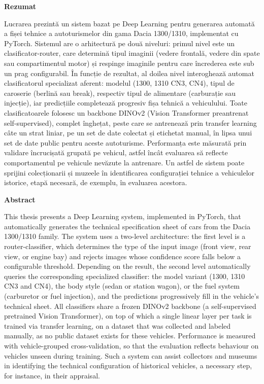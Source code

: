 \begin{abstractpage}
	\begin{center}
		{\bf Rezumat}
	\end{center}
	\indent Lucrarea prezintă un sistem bazat pe Deep Learning pentru generarea automată a fișei tehnice a autoturismelor din gama Dacia 1300/1310, implementat cu PyTorch. Sistemul are o arhitectură pe două niveluri: primul nivel este un clasificator-router, care determină tipul imaginii (vedere frontală, vedere din spate sau compartimentul motor) și respinge imaginile pentru care încrederea este sub un prag configurabil. În funcție de rezultat, al doilea nivel interoghează automat clasificatorul specializat aferent: modelul (1300, 1310 CN3, CN4), tipul de caroserie (berlină sau break), respectiv tipul de alimentare (carburație sau injecție), iar predicțiile completează progresiv fișa tehnică a vehiculului. Toate clasificatoarele folosesc un backbone DINOv2 (Vision Transformer preantrenat self-supervised), complet înghețat, peste care se antrenează prin transfer learning câte un strat liniar, pe un set de date colectat și etichetat manual, în lipsa unui set de date public pentru aceste autoturisme. Performanța este măsurată prin validare încrucișată grupată pe vehicul, astfel încât evaluarea să reflecte comportamentul pe vehicule nevăzute la antrenare. Un astfel de sistem poate sprijini colecționarii și muzeele în identificarea configurației tehnice a vehiculelor istorice, etapă necesară, de exemplu, în evaluarea acestora.

	\begin{center}
		{\bf Abstract}
	\end{center}
	\indent This thesis presents a Deep Learning system, implemented in PyTorch, that automatically generates the technical specification sheet of cars from the Dacia 1300/1310 family. The system uses a two-level architecture: the first level is a router-classifier, which determines the type of the input image (front view, rear view, or engine bay) and rejects images whose confidence score falls below a configurable threshold. Depending on the result, the second level automatically queries the corresponding specialized classifier: the model variant (1300, 1310 CN3 and CN4), the body style (sedan or station wagon), or the fuel system (carburetor or fuel injection), and the predictions progressively fill in the vehicle's technical sheet. All classifiers share a frozen DINOv2 backbone (a self-supervised pretrained Vision Transformer), on top of which a single linear layer per task is trained via transfer learning, on a dataset that was collected and labeled manually, as no public dataset exists for these vehicles. Performance is measured with vehicle-grouped cross-validation, so that the evaluation reflects behaviour on vehicles unseen during training. Such a system can assist collectors and museums in identifying the technical configuration of historical vehicles, a necessary step, for instance, in their appraisal.
\end{abstractpage}
